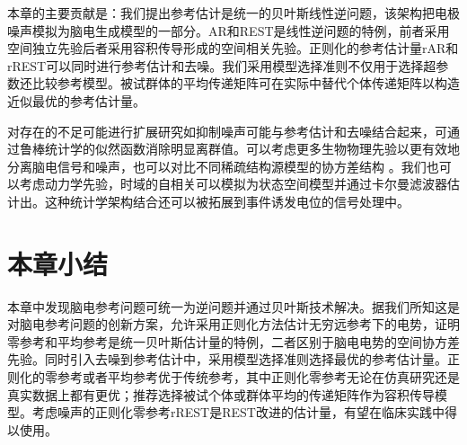 本章的主要贡献是：我们提出参考估计是统一的贝叶斯线性逆问题，该架构把电极噪声模拟为脑电生成模型的一部分。AR和REST是线性逆问题的特例，前者采用空间独立先验后者采用容积传导形成的空间相关先验。正则化的参考估计量rAR和rREST可以同时进行参考估计和去噪。我们采用模型选择准则不仅用于选择超参数还比较参考模型。被试群体的平均传递矩阵可在实际中替代个体传递矩阵以构造近似最优的参考估计量。

对存在的不足可能进行扩展研究如抑制噪声可能与参考估计和去噪结合起来，可通过鲁棒统计学的似然函数消除明显离群值。可以考虑更多生物物理先验以更有效地分离脑电信号和噪声，也可以对比不同稀疏结构源模型的协方差结构
。我们也可以考虑动力学先验，时域的自相关可以模拟为状态空间模型并通过卡尔曼滤波器估计出。这种统计学架构结合还可以被拓展到事件诱发电位的信号处理中。

\section{本章小结}
本章中发现脑电参考问题可统一为逆问题并通过贝叶斯技术解决。据我们所知这是对脑电参考问题的创新方案，允许采用正则化方法估计无穷远参考下的电势，证明零参考和平均参考是统一贝叶斯估计量的特例，二者区别于脑电电势的空间协方差先验。同时引入去噪到参考估计中，采用模型选择准则选择最优的参考估计量。正则化的零参考或者平均参考优于传统参考，其中正则化零参考无论在仿真研究还是真实数据上都有更优；推荐选择被试个体或群体平均的传递矩阵作为容积传导模型。考虑噪声的正则化零参考rREST是REST改进的估计量，有望在临床实践中得以使用。